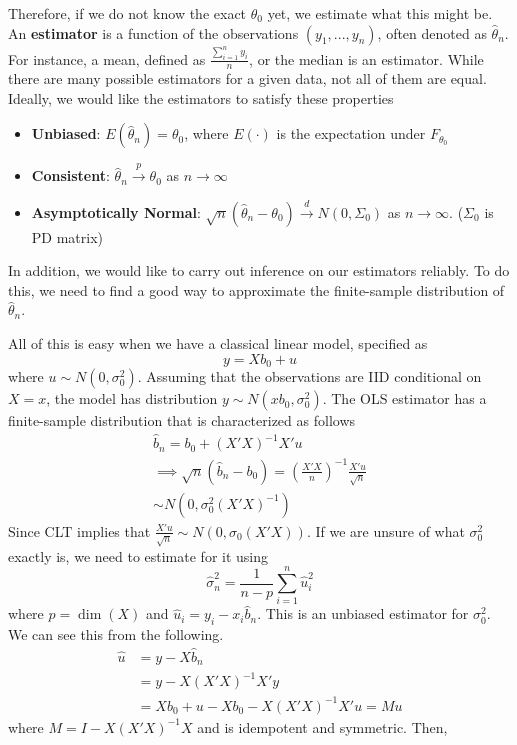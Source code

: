 \documentclass[12pt]{article}
\theoremstyle{definition}
\theoremstyle{property}
\theoremstyle{assumption}
\theoremstyle{example}
\theoremstyle{comment}
\begin{document}
Therefore, if we do not know the exact $\theta_0$ yet, we estimate what this might be. An \textbf{estimator} is a function of the observations $(y_1,...,y_n)$, often denoted as $\hat{\theta}_n$. For instance, a mean, defined as $\frac{\sum_{i=1}^n y_i}{n}$, or the median is an estimator. While there are many possible estimators for a given data, not all of them are equal. Ideally, we would like the estimators to satisfy these properties
\begin{itemize}
\item \textbf{Unbiased}: $E(\hat{\theta}_n)=\theta_0$, where $E(\cdot)$ is the expectation under $F_{\theta_0}$
\item \textbf{Consistent}: $\hat{\theta}_n\xrightarrow{p} \theta_0$ as $n\to\infty$
\item \textbf{Asymptotically Normal}: $\sqrt{n}(\hat{\theta}_n-\theta_0) \xrightarrow{d} N(0,\Sigma_0)$ as $n\to\infty$. ($\Sigma_0$ is PD matrix)
\end{itemize}
In addition, we would like to carry out inference on our estimators reliably. To do this, we need to find a good way to approximate the finite-sample distribution of $\hat{\theta}_n$. \par
All of this is easy when we have a classical linear model, specified as 
\[
y=Xb_0+u
\]
where $u\sim N(0,\sigma_0^2)$. Assuming that the observations are IID conditional on $X=x$, the model has distribution $y\sim N(xb_0,\sigma_0^2)$. The OLS estimator has a finite-sample distribution that is characterized as follows
\begin{gather*}
\hat{b}_n = b_0 + (X'X)^{-1}X'u\\
\implies \sqrt{n}(\hat{b}_n-b_0)=\left(\frac{X'X}{n}\right)^{-1}\frac{X'u}{\sqrt{n}}\\
\sim N(0,\sigma_0^2(X'X)^{-1})
\end{gather*}
Since CLT implies that $\frac{X'u}{\sqrt{n}}\sim N(0,\sigma_0(X'X))$. If we are unsure of what $\sigma_0^2$ exactly is, we need to estimate for it using
\[
\hat{\sigma}_n^2 = \frac{1}{n-p}\sum_{i=1}^n \hat{u}_i^2
\]
where $p=\dim(X)$ and $\hat{u}_i = y_i - x_i\hat{b}_n$. This is an unbiased estimator for $\sigma_0^2$. We can see this from the following.
\begin{align*}
\hat{u} &= y-X\hat{b}_n\\
&=y-X(X'X)^{-1}X'y\\
&=Xb_0+u-Xb_0-X(X'X)^{-1}X'u = Mu 
\end{align*}
where $M=I-X(X'X)^{-1}X$ and is idempotent and symmetric. Then, 
\end{document}
